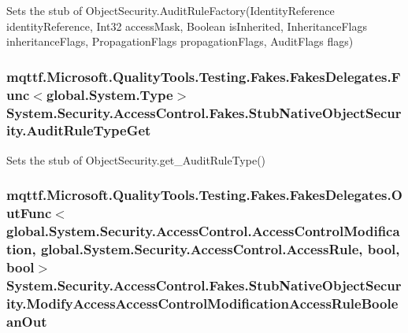 Sets the stub of Object\-Security.\-Audit\-Rule\-Factory(\-Identity\-Reference identity\-Reference, Int32 access\-Mask, Boolean is\-Inherited, Inheritance\-Flags inheritance\-Flags, Propagation\-Flags propagation\-Flags, Audit\-Flags flags)

\hypertarget{class_system_1_1_security_1_1_access_control_1_1_fakes_1_1_stub_native_object_security_a6630cf8652964fc5fd9d9a50ef5d6a03}{
\subsubsection[{Audit\-Rule\-Type\-Get}]{\setlength{\rightskip}{0pt plus 5cm}mqttf.\-Microsoft.\-Quality\-Tools.\-Testing.\-Fakes.\-Fakes\-Delegates.\-Func$<$global.\-System.\-Type$>$ System.\-Security.\-Access\-Control.\-Fakes.\-Stub\-Native\-Object\-Security.\-Audit\-Rule\-Type\-Get}}\label{class_system_1_1_security_1_1_access_control_1_1_fakes_1_1_stub_native_object_security_a6630cf8652964fc5fd9d9a50ef5d6a03}


Sets the stub of Object\-Security.\-get\-\_\-\-Audit\-Rule\-Type()

\hypertarget{class_system_1_1_security_1_1_access_control_1_1_fakes_1_1_stub_native_object_security_a123d5770cf40c5cd5f4e7775c196c6e7}{
\subsubsection[{Modify\-Access\-Access\-Control\-Modification\-Access\-Rule\-Boolean\-Out}]{\setlength{\rightskip}{0pt plus 5cm}mqttf.\-Microsoft.\-Quality\-Tools.\-Testing.\-Fakes.\-Fakes\-Delegates.\-Out\-Func$<$global.\-System.\-Security.\-Access\-Control.\-Access\-Control\-Modification, global.\-System.\-Security.\-Access\-Control.\-Access\-Rule, bool, bool$>$ System.\-Security.\-Access\-Control.\-Fakes.\-Stub\-Native\-Object\-Security.\-Modify\-Access\-Access\-Control\-Modification\-Access\-Rule\-Boolean\-Out}}\label{class_system_1_1_security_1_1_access_control_1_1_fakes_1_1_stub_native_object_security_a123d5770cf40c5cd5f4e7775c196c6e7}


